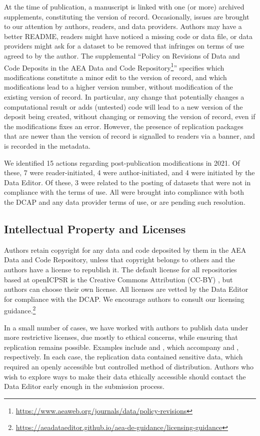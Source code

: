 \documentclass[PP]{AEA}
\newcommand{\aeadcr}{AEA Data and Code Repository}
\newcommand{\urlcite}[2]{#2\footnote{\url{#1}}}
\newcommand{\purlcite}[2]{#2.\footnote{\url{#1}}}
\begin{document}
At the time of publication, a manuscript is linked with one (or more) archived supplements, constituting the version of record. Occasionally, issues are brought to our attention by authors, readers, and data providers. Authors may have a better README, readers might have noticed a missing code or data file, or data providers might ask for a dataset to be removed that infringes on terms of use agreed to by the author. The supplemental ``\urlcite{https://www.aeaweb.org/journals/data/policy-revisions}{Policy on Revisions of Data and Code Deposits in the AEA Data and Code Repository}'' specifies which modifications constitute a minor edit to the version of record, and which modifications lead to a higher version number, without modification of the existing version of record. In particular, any change that potentially changes a computational result or adds (untested) code will lead to a new version of the deposit being created, without changing or removing the version of record, even if the modifications fixes an error. However, the presence of replication packages that are newer than the version of record is signalled to readers via a banner, and is recorded in the metadata.

We identified 15 actions regarding post-publication modifications in 2021. Of these, 7 were reader-initiated, 4 were author-initiated, and 4 were initiated by the Data Editor. Of these, 3 were related to the posting of datasets that were not in compliance with the terms of use. All were brought into compliance with both the \ac{DCAP} and any data provider terms of use, or are pending such resolution.

\subsection{Intellectual Property and Licenses} 
\label{sec:ip}

Authors retain  copyright for any data and code deposited by them in the \aeadcr{}, unless that copyright belongs to others and the authors have a license to republish it. The default license for all repositories based at openICPSR is the  Creative Commons Attribution (CC-BY) \citep{CreativeCommons2017}, but authors can choose their own license. All  licenses  are vetted by the Data Editor for compliance with the \ac{DCAP}. We encourage authors to consult our \purlcite{https://aeadataeditor.github.io/aea-de-guidance/licensing-guidance}{licensing guidance} 

In a small number of cases, we have worked with authors to publish data under more restrictive licenses, due mostly to ethical concerns, while ensuring that replication remains possible. Examples include \citet{deryugina2021data} and \citet{goncalves2021data}, which accompany \citet{deryugina2021} and \citet{goncalves2021}, respectively. In each case, the replication data contained sensitive data, which required an openly accessible but controlled method of distribution.  Authors who wish to explore ways to make their data ethically accessible should contact the Data Editor early enough in the submission process. 
\end{document}
